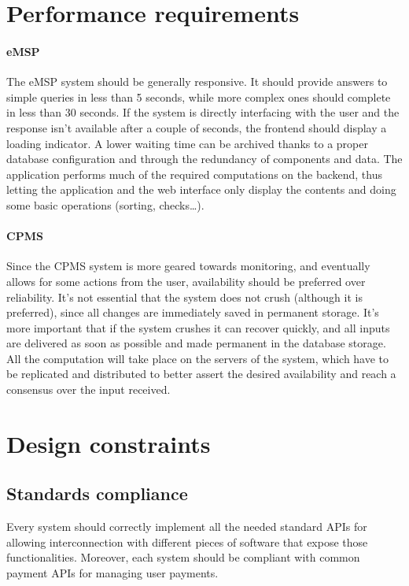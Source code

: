 \pagebreak

\section{Performance requirements}

\paragraph{eMSP} The eMSP system should be generally responsive. It should provide answers to simple queries in less than 5 seconds, while more complex ones should complete in less than 30 seconds. If the system is directly interfacing with the user and the response isn't available after a couple of seconds, the frontend should display a loading indicator. A lower waiting time can be archived thanks to a proper database configuration and through the redundancy of components and data. The application performs much of the required computations on the backend, thus letting the application and the web interface only display the contents and doing some basic operations (sorting, checks\dots).

\paragraph{CPMS} Since the CPMS system is more geared towards monitoring, and eventually allows for some actions from the user, availability should be preferred over reliability. It's not essential that the system does not crush (although it is preferred), since all changes are immediately saved in permanent storage. It's more important that if the system crushes it can recover quickly, and all inputs are delivered as soon as possible and made permanent in the database storage. All the computation will take place on the servers of the system, which have to be replicated and distributed to better assert the desired availability and reach a consensus over the input received.

\section{Design constraints}

\subsection{Standards compliance}

Every system should correctly implement all the needed standard APIs for allowing interconnection with different pieces of software that expose those functionalities. Moreover, each system should be compliant with common payment APIs for managing user payments.

